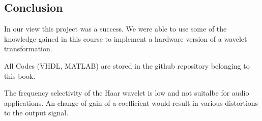 \begin{refsection}
%









\section{Conclusion}

In our view this project was a success. We were able to use some of the knowledge gained in this course to implement a hardware version of a wavelet transformation.

All Codes (VHDL, MATLAB) are stored in the github repository belonging to this book. \cite{fpga:gitrepo-wavelets}

The frequency selectivity of the Haar wavelet is low and not suitalbe for audio applications.
An change of gain of a coefficient would result in various distortions to the output signal.

\printbibliography[heading=subbibliography]
\end{refsection}
